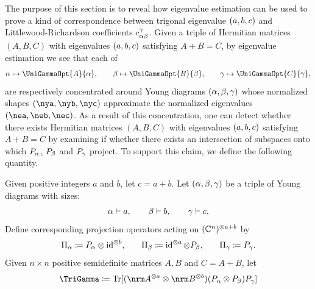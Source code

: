 \documentclass[notitlepage, 10pt]{article}
\begin{document}
The purpose of this section is to reveal how eigenvalue estimation can be used to prove a kind of correspondence between trigonal eigenvalue $(a,b,c)$ and Littlewood-Richardson coefficients $c_{\alpha\beta}^{\gamma}$.
Given a triple of Hermitian matrices $(A,B,C)$ with eigenvalues $(a,b,c)$ satisfying $A+B=C$, by eigenvalue estimation we see that each of
\begin{equation}
    \ya \mapsto \UniGammaOpt{A}{\ya}, \qquad
    \yb  \mapsto \UniGammaOpt{B}{\yb}, \qquad
    \yc \mapsto \UniGammaOpt{C}{\yc},
\end{equation}
are respectively concentrated around Young diagrams $(\alpha,\beta,\gamma)$ whose normalized shapes $(\nya, \nyb, \nyc)$ approximate the normalized eigenvalues $(\nea,\neb,\nec)$.
As a result of this concentration, one can detect whether there exists Hermitian matrices $(A,B,C)$ with eigenvalues $(a,b,c)$ satisfying $A+B=C$ by examining if whether there exists an intersection of subspaces onto which $P_{\alpha}$, $P_{\beta}$ and $P_{\gamma}$ project.
To support this claim, we define the following quantity.
\begin{defn}
    Given positive integers $a$ and $b$, let $c=a+b$.
    Let $(\alpha, \beta, \gamma)$ be a triple of Young diagrams with sizes:
    \begin{equation}
        \label{eq:three_yd_sizes}
        \alpha \vdash a, \qquad
        \beta \vdash b, \qquad
        \gamma \vdash c,
    \end{equation}
    Define corresponding projection operators acting on $(\mathbb C^{n})^{\otimes a+b}$ by
    \begin{equation}
        \label{eq:tri_extended_projs}
        \begin{alignedat}{3}
            &\Pi_{\alpha} \coloneqq P_{\alpha} \otimes \operatorname{id}^{\otimes b}, \qquad
            &&\Pi_{\beta} \coloneqq \operatorname{id}^{\otimes a} \otimes P_{\beta}, \qquad
            &&\Pi_{\gamma} \coloneqq P_{\gamma}.
        \end{alignedat}
    \end{equation}
    Given $n\times n$ positive semidefinite matrices $A,B$ and $C=A+B$, let
    \begin{equation}
        \TriGamma
        \coloneqq \Tr[(\nrm A^{\ot a} \ot \nrm B^{\ot b}) (P_{\ya} \ot P_{\yb}) P_{\yc}]
    \end{equation}
\end{defn}
\end{document}
